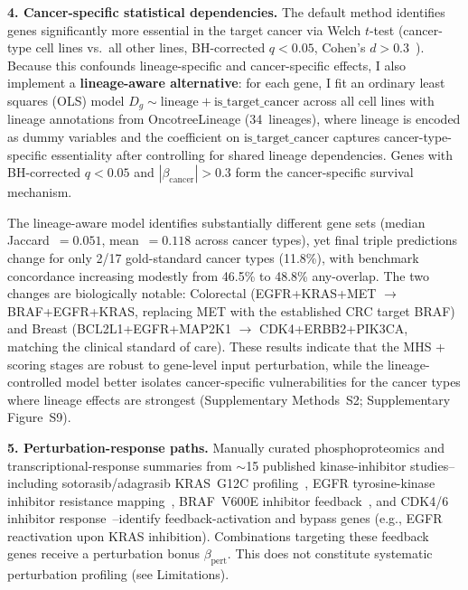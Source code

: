 \documentclass[11pt]{article}
\begin{document}
\textbf{4. Cancer-specific statistical dependencies.} The default method identifies genes significantly more essential in the target cancer via Welch $t$-test (cancer-type cell lines vs.\ all other lines, BH-corrected $q < 0.05$, Cohen's $d > 0.3$~\cite{Benjamini1995,Cohen1988}). Because this confounds lineage-specific and cancer-specific effects, I also implement a \textbf{lineage-aware alternative}: for each gene, I fit an ordinary least squares (OLS) model $D_g \sim \text{lineage} + \text{is\_target\_cancer}$ across all cell lines with lineage annotations from OncotreeLineage (34~lineages), where lineage is encoded as dummy variables and the coefficient on $\text{is\_target\_cancer}$ captures cancer-type-specific essentiality after controlling for shared lineage dependencies. Genes with BH-corrected $q < 0.05$ and $|\beta_{\text{cancer}}| > 0.3$ form the cancer-specific survival mechanism.

The lineage-aware model identifies substantially different gene sets (median Jaccard~$= 0.051$, mean~$= 0.118$ across cancer types), yet final triple predictions change for only 2/17 gold-standard cancer types (11.8\%), with benchmark concordance increasing modestly from 46.5\% to 48.8\% any-overlap. The two changes are biologically notable: Colorectal (EGFR+KRAS+MET $\to$ BRAF+EGFR+KRAS, replacing MET with the established CRC target BRAF) and Breast (BCL2L1+EGFR+MAP2K1 $\to$ CDK4+ERBB2+PIK3CA, matching the clinical standard of care). These results indicate that the MHS + scoring stages are robust to gene-level input perturbation, while the lineage-controlled model better isolates cancer-specific vulnerabilities for the cancer types where lineage effects are strongest (Supplementary Methods~S2; Supplementary Figure~S9).

\textbf{5. Perturbation-response paths.} Manually curated phosphoproteomics and transcriptional-response summaries from $\sim$15 published kinase-inhibitor studies--including sotorasib/adagrasib KRAS~G12C profiling~\cite{Canon2019,Hallin2020}, EGFR tyrosine-kinase inhibitor resistance mapping~\cite{Bivona2011}, BRAF~V600E inhibitor feedback~\cite{Bollag2010,Lito2012}, and CDK4/6 inhibitor response~\cite{Finn2015}--identify feedback-activation and bypass genes (e.g., EGFR reactivation upon KRAS inhibition). Combinations targeting these feedback genes receive a perturbation bonus $\beta_{\text{pert}}$. This does not constitute systematic perturbation profiling (see Limitations).
\end{document}
